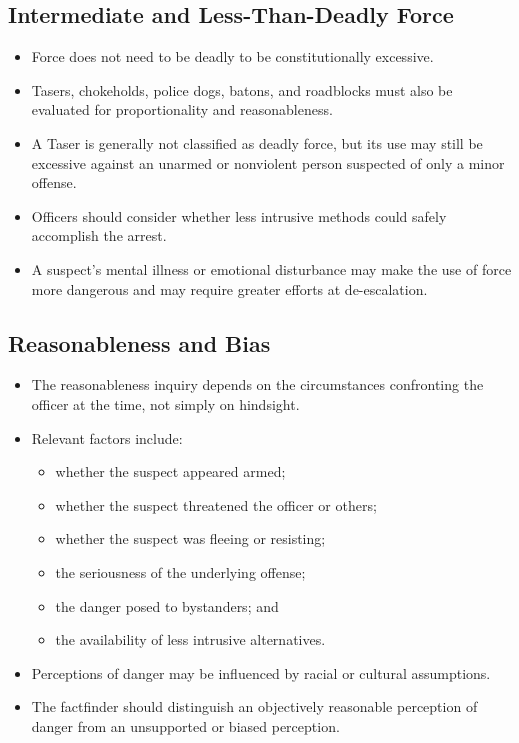 \documentclass[11pt]{tex/lawoutline}
\begin{document}
\subsection{Intermediate and Less-Than-Deadly Force}
{
\begin{itemize}
    \item Force does not need to be deadly to be constitutionally excessive.
    \item Tasers, chokeholds, police dogs, batons, and roadblocks must also be evaluated for proportionality and reasonableness.
    \item A Taser is generally not classified as deadly force, but its use may still be excessive against an unarmed or nonviolent person suspected of only a minor offense.
    \item Officers should consider whether less intrusive methods could safely accomplish the arrest.
    \item A suspect's mental illness or emotional disturbance may make the use of force more dangerous and may require greater efforts at de-escalation.
\end{itemize}
}

\subsection{Reasonableness and Bias}
{
\begin{itemize}
    \item The reasonableness inquiry depends on the circumstances confronting the officer at the time, not simply on hindsight.
    \item Relevant factors include:
    \begin{itemize}
        \item whether the suspect appeared armed;
        \item whether the suspect threatened the officer or others;
        \item whether the suspect was fleeing or resisting;
        \item the seriousness of the underlying offense;
        \item the danger posed to bystanders; and
        \item the availability of less intrusive alternatives.
    \end{itemize}
    \item Perceptions of danger may be influenced by racial or cultural assumptions.
    \item The factfinder should distinguish an objectively reasonable perception of danger from an unsupported or biased perception.
\end{itemize}
}
\end{document}
